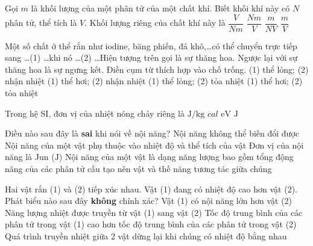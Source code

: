 \begin{ex}
	Gọi $m$ là khối lượng của một phân tử của một chất khí. Biết khối khí này có $N$ phân tử, thể tích là $V$. Khối lượng riêng của chất khí này là
	\choice
	{$\dfrac{V}{Nm}$}
	{\True $\dfrac{Nm}{V}$}
	{$\dfrac{m}{NV}$}
	{$\dfrac{m}{V}$}
	\loigiai{}
\end{ex}
\begin{ex}
Một số chất ở thể rắn như iodine, băng phiến, đá khô,\dots có thể chuyển trực tiếp sang \dots (1) 
\dots khi nó \dots (2) \dots Hiện tượng trên gọi là sự thăng hoa. Ngược lại với sự thăng hoa là sự ngưng kết. Điền cụm từ thích hợp vào chố trống.	
	\choice
	{(1) thể lỏng; (2) nhận nhiệt}
	{\True (1) thể hơi; (2) nhận nhiệt}
	{(1) thể lỏng; (2) tỏa nhiệt}
	{(1) thể hơi; (2) tỏa nhiệt}
	\loigiai{}
\end{ex} %
%
\begin{ex}
	Trong hệ SI, đơn vị của nhiệt nóng chảy riêng là
	\choice
	{\True $\si{\joule/\kilogram}$}
	{$\si{cal}$}
	{$\si{\electronvolt}$}
	{$\si{\joule}$}
	\loigiai{}
\end{ex}
\begin{ex}
	Điều nào sau đây là \textbf{sai} khi nói về nội năng?
	\choice
	{\True Nội năng không thể biến đổi được}
	{Nội năng của một vật phụ thuộc vào nhiệt độ và thể tích của vật}
	{Đơn vị của nội năng là Jun ($\si{\joule}$)}
	{Nội năng của một vật là dạng năng lượng bao gồm tổng động năng của các phân tử cấu tạo nên vật và thế năng tương tác giữa chúng}
	\loigiai{}
\end{ex}
\begin{ex}
Hai vật rắn (1) và (2) tiếp xúc nhau. Vật (1) đang có nhiệt độ cao hơn vật (2). Phát biểu nào sau đây \textbf{không} chính xác?	
	\choice
	{\True Vật (1) có nội năng lớn hơn vật (2)}
	{Năng lượng nhiệt được truyền từ vật (1) sang vật (2)}
	{Tốc độ trung bình của các phân tử trong vật (1) cao hơn tốc độ trung bình của các phân tử trong vật (2)}
	{Quá trình truyền nhiệt giữa 2 vật dừng lại khi chúng có nhiệt độ bằng nhau}
\end{ex}

